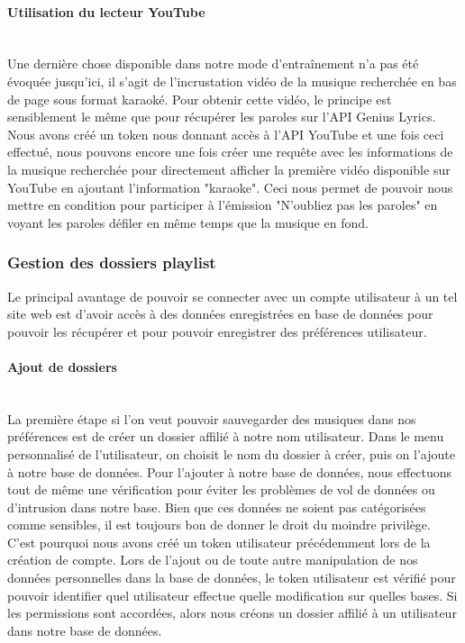 \documentclass[12pt,french]{article}
\begin{document}
\paragraph{Utilisation du lecteur YouTube \\\\}

Une dernière chose disponible dans notre mode d'entraînement n'a pas été évoquée jusqu'ici, il s'agit de l'incrustation vidéo de la musique recherchée en bas de page sous format karaoké. Pour obtenir cette vidéo, le principe est sensiblement le même que pour récupérer les paroles sur l'\gls{API} Genius Lyrics. Nous avons créé un token nous donnant accès à l'\gls{API} YouTube et une fois ceci effectué, nous pouvons encore une fois créer une requête avec les informations de la musique recherchée pour directement afficher la première vidéo disponible sur YouTube en ajoutant l'information "karaoke". Ceci nous permet de pouvoir nous mettre en condition pour participer à l'émission "N'oubliez pas les paroles" en voyant les paroles défiler en même temps que la musique en fond.  

\subsubsection{Gestion des dossiers playlist}

Le principal avantage de pouvoir se connecter avec un compte utilisateur à un tel site web est d'avoir accès à des données enregistrées en base de données pour pouvoir les récupérer et pour pouvoir enregistrer des préférences utilisateur.

\paragraph{Ajout de dossiers \\\\}

La première étape si l'on veut pouvoir sauvegarder des musiques dans nos préférences est de créer un dossier affilié à notre nom utilisateur. Dans le menu personnalisé de l'utilisateur, on choisit le nom du dossier à créer, puis on l'ajoute à notre base de données. Pour l'ajouter à notre base de données, nous effectuons tout de même une vérification pour éviter les problèmes de vol de données ou d'intrusion dans notre base. Bien que ces données ne soient pas catégorisées comme sensibles, il est toujours bon de donner le droit du moindre privilège. C'est pourquoi nous avons créé un token utilisateur précédemment lors de la création de compte. Lors de l'ajout ou de toute autre manipulation de nos données personnelles dans la base de données, le token utilisateur est vérifié pour pouvoir identifier quel utilisateur effectue quelle modification sur quelles bases. Si les permissions sont accordées, alors nous créons un dossier affilié à un utilisateur dans notre base de données.
\end{document}
